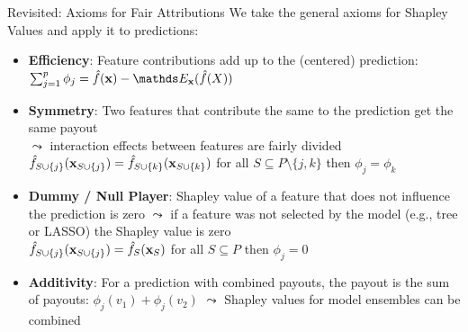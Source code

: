 \documentclass[11pt,compress,t,notes=noshow, aspectratio=169, xcolor=table]{beamer}
\begin{document}
\begin{frame}{Revisited: Axioms for Fair Attributions}
  We take the general axioms for Shapley Values and apply it to predictions:
  \vspace{0.25cm}
  \begin{itemize}[<+->]
  \itemsep1em
    \item \textbf{Efficiency}: Feature contributions add up to the (centered) prediction: %
    $\sum\nolimits_{j=1}^p\phi_j=\fh(\xv)-\E_{\xv}(\fh(X))$
    \item \textbf{Symmetry}: Two features that contribute the same to the prediction get the same payout\\
    $\leadsto$ interaction effects between features are fairly divided \\
      $\fh_{S\cup\{j\}}(\xv_{\Scupj}) = \fh_{\Scupk}(\xv_{\Scupk})$ for all $S \subseteq P\setminus\{j,k\}$ then $\phi_j=\phi_k$
    \item \textbf{Dummy / Null Player}: Shapley value of a feature that does not influence the prediction is zero $\leadsto$ if a feature was not selected by the model (e.g., tree or LASSO) the Shapley value is zero  \\
      $\fh_{\Scupj}(\xv_{\Scupj})=\fhS(\xv_S)$ for all $S \subseteq P$ then $\phi_j=0$
    \item \textbf{Additivity}:  For a prediction with combined payouts, the
      payout is the sum of payouts: $\phi_j(v_1) + \phi_j(v_2)$ $\leadsto$ Shapley values for model ensembles can be combined
  \end{itemize}
\end{frame}



\end{document}
